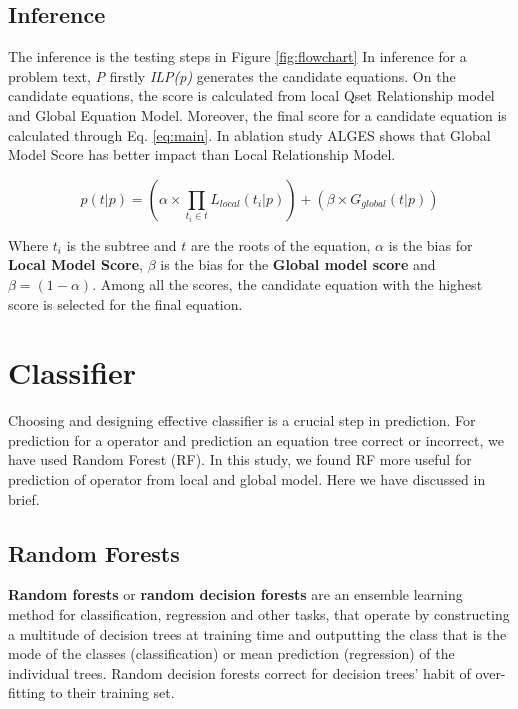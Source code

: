 \documentclass[document.tex]{subfiles}
\begin{document}
\subsection{Inference}
The inference is the testing steps in Figure \ref{fig:flowchart} In inference for a problem text, \textit{P} firstly \textit{ILP(p)} generates the candidate equations. On the candidate equations, the score is calculated from local Qset Relationship model and Global Equation Model. Moreover, the final score for a candidate equation is calculated through Eq. \ref{eq:main}. In ablation study ALGES shows that Global Model Score has better impact than Local Relationship Model.

\begin{equation}
	p(t|p) = (\alpha \times \prod_{t_i \in t} L_{local}(t_i | p) ) + (\beta \times G_{global}(t|p))
	\label{eq:main}
\end{equation}

Where $t_i$ is the subtree and $t$ are the roots of the equation, $\alpha$ is the bias for \textbf{Local Model Score}, $\beta$ is the bias for the \textbf{Global model score} and $\beta = (1 - \alpha)$. Among all the scores, the candidate equation with the highest score is selected for the final equation.

\section{Classifier} Choosing and designing effective classifier is a crucial step in prediction. For prediction for a operator and prediction an equation tree correct or incorrect, we have used Random Forest (RF). In this study, we found RF more useful for prediction of operator from local and global model. Here we have discussed in brief.

\subsection{Random Forests}
\textbf{Random forests} or \textbf{random decision forests} are an ensemble learning method for classification, regression and other tasks, that operate by constructing a multitude of decision trees at training time and outputting the class that is the mode of the classes (classification) or mean prediction (regression) of the individual trees. Random decision forests correct for decision trees' habit of over-fitting to their training set.
\end{document}
